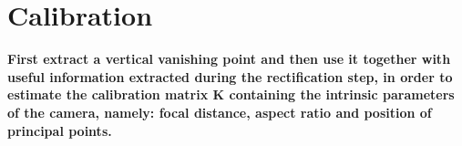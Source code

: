 \documentclass[11pt, oneside]{article}
\begin{document}
\section{Calibration}
\textbf{First extract a vertical vanishing point and then use it together with useful information extracted during the rectification step, in order to estimate the calibration matrix K containing the intrinsic parameters of the camera, namely: focal distance, aspect ratio and position of principal points.} \hfill \break
\end{document}
